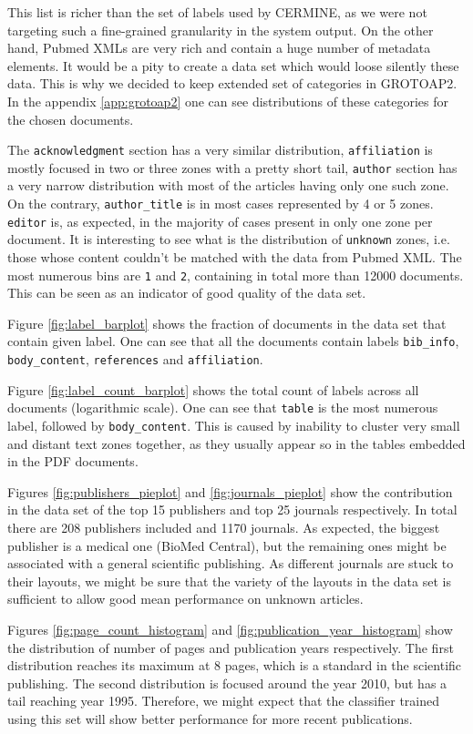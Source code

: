 This list is richer than the set of labels used by CERMINE, as we were not targeting such a fine-grained granularity in the system output. On the other hand, Pubmed XMLs are very rich and contain a huge number of metadata elements. It would be a pity to create a data set which would loose silently these data. This is why we decided to keep extended set of categories in GROTOAP2. In the appendix \ref{app:grotoap2} one can see distributions of these categories for the chosen documents.

The \verb+acknowledgment+ section has a very similar distribution, \verb+affiliation+ is mostly focused in two or three zones with a pretty short tail, \verb+author+ section has a very narrow distribution with most of the articles having only one such zone. On the contrary, \verb+author_title+ is in most cases represented by 4 or 5 zones. \verb+editor+ is, as expected, in the majority of cases present in only one zone per document. It is interesting to see what is the distribution of \verb+unknown+ zones, i.e. those whose content couldn't be matched with the data from Pubmed XML. The most numerous bins are \verb+1+ and \verb+2+, containing in total more than 12000 documents. This can be seen as an indicator of good quality of the data set.

Figure \ref{fig:label_barplot} shows the fraction of documents in the data set that contain given label. One can see that all the documents contain labels \verb+bib_info+, \verb+body_content+, \verb+references+ and \verb+affiliation+.

Figure \ref{fig:label_count_barplot} shows the total count of labels across all documents (logarithmic scale). One can see that \verb+table+ is the most numerous label, followed by \verb+body_content+. This is caused by inability to cluster very small and distant text zones together, as they usually appear so in the tables embedded in the PDF documents.

Figures \ref{fig:publishers_pieplot} and \ref{fig:journals_pieplot} show the contribution in the data set of the top 15 publishers and top 25 journals respectively. In total there are 208 publishers included and 1170 journals. As expected, the biggest publisher is a medical one (BioMed Central), but the remaining ones might be associated with a general scientific publishing. As different journals are stuck to their layouts, we might be sure that the variety of the layouts in the data set is sufficient to allow good mean performance on unknown articles.

Figures \ref{fig:page_count_histogram} and \ref{fig:publication_year_histogram} show the distribution of number of pages and publication years respectively. The first distribution reaches its maximum at 8 pages, which is a standard in the scientific publishing. The second distribution is focused around the year 2010, but has a tail reaching year 1995. Therefore, we might expect that the classifier trained using this set will show better performance for more recent publications.

